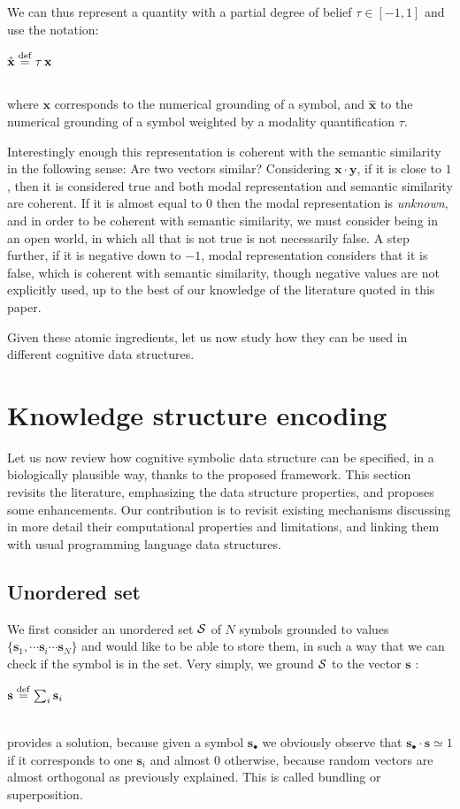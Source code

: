 \documentclass[sn-mathphys]{sn-jnl}
\newcommand{\defq}{\stackrel {\rm def}{=}}
\newcommand{\eqline}[1]{~\vspace{0.1cm}\\\centerline{$#1$}\vspace{0.1cm}\\}
\begin{document}
We can thus represent a quantity with a partial degree of belief $\tau \in [-1, 1]$ and use the notation:
\eqline{\hat{\mathbf{x}} \defq \tau \, \mathbf{x}}
where $\mathbf{x}$ corresponds to the numerical grounding of a symbol, and $\hat{\mathbf{x}}$ to the numerical grounding of a symbol weighted by a modality quantification $\tau$.

Interestingly enough this representation is coherent with the semantic similarity in the following sense: Are two vectors similar? Considering $\mathbf{x} \cdot \mathbf{y}$, if it is close to $1$, then it is considered true and both modal representation and semantic similarity are coherent. If it is almost equal to $0$ then the modal representation is {\em unknown}, and in order to be coherent with semantic similarity, we must consider being in an open world, in which all that is not true is not necessarily false. A step further, if it is negative down to $-1$, modal representation considers that it is false, which is coherent with semantic similarity, though negative values are not explicitly used, up to the best of our knowledge of the literature quoted in this paper.

Given these atomic ingredients, let us now study how they can be used in different cognitive data structures.

\section{Knowledge structure encoding}

Let us now review how cognitive symbolic data structure can be specified, in a biologically plausible way, thanks to the proposed framework. This section revisits the literature, emphasizing the data structure properties, and proposes some enhancements. Our contribution is to revisit existing mechanisms discussing in more detail their computational properties and limitations, and linking them with usual programming language data structures.

\subsection{Unordered set}

We first consider an unordered set ${\cal S}$ of $N$ symbols grounded to values $\{\mathbf{s}_1, \cdots \mathbf{s}_i \cdots \mathbf{s}_N\}$ and would like to be able to store them, in such a way that we can check if the symbol is in the set. Very simply, we ground ${\cal S}$ to the vector $\mathbf{s}$ :
\eqline{\mathbf{s} \defq \sum_i \mathbf{s}_i}
provides a solution, because given a symbol $\mathbf{s}_\bullet$ we obviously observe that $\mathbf{s}_\bullet \cdot \mathbf{s} \simeq 1$ if it corresponds to one $\mathbf{s}_i$ and almost $0$ otherwise, because random vectors are almost orthogonal as previously explained. This is called bundling \cite{schlegel_comparison_2020} or superposition.
\end{document}
